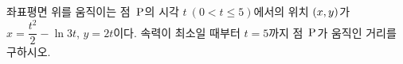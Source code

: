 좌표평면 위를 움직이는 점~$\mathrm{P}$의 시각 $t\ (0<t\le 5)$에서의 위치 $(x{,}\mkern3mu\mathopen{}y)$가 $x=\dfrac{t^2}{2}-\ln 3t$, $y=2t$이다. 속력이 최소일 때부터 $t=5$까지 점~$\mathrm{P}$가 움직인 거리를 구하시오.
